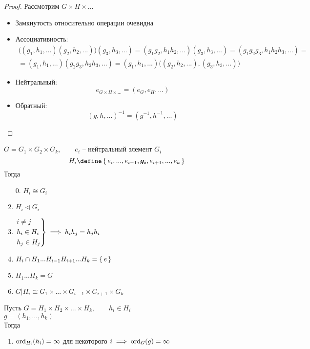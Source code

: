 \begin{proof}
    Рассмотрим $ G \times H \times ... $
    \begin{itemize}
    	\item Замкнутость относительно операции очевидна
        \item Ассоциативность:
        \begin{multline*}
            \bigg( (g_1, h_1, ...)(g_2, h_2, ...) \bigg) (g_3, h_3, ...) = (g_1g_2, h_1h_2, ...)(g_3, h_3, ...) = (g_1g_2g_3, h_1h_2h_3, ...) = \\ = (g_1, h_1, ...)(g_2g_3, h_2h_3, ...) = (g_1, h_1, ...) \bigg( (g_2, h_2, ...), (g_3, h_3, ...) \bigg)
        \end{multline*}
        \item Нейтральный:
        $$ e_{G \times H \times ...} = (e_G, e_H, ...) $$
        \item Обратный:
        $$ (g, h, ...)^{-1} = (g^{-1}, h^{-1}, ...) $$
    \end{itemize}
\end{proof}

\begin{property}
    $ G = G_1 \times G_2 \times G_k, \qquad e_i $ -- нейтральный элемент $ G_i $
    $$ H_i \define \set{e_i, ..., e_{i - 1}, \bm{g_i}, e_{i + 1}, ..., e_k} $$
    Тогда
    \begin{enumerate}
        \item[0.] $ H_i \cong G_i $
    	\item $ H_i \vartriangleleft G_i $
        \item $
        \begin{rcases}
        	i \ne j \\
            h_i \in H_i \\
            h_j \in H_j
        \end{rcases} \implies h_ih_j = h_jh_i $
        \item $ H_i \cap H_1 ... H_{i - 1}H_{i + 1} ... H_k = \set{e} $
        \item $ H_1 ... H_k = G $
        \item $ G|H_i \cong G_1 \times ... \times G_{i - 1} \times G_{i + 1} \times G_k $
    \end{enumerate}
\end{property}

\begin{lemma}
	Пусть $ G = H_1 \times H_2 \times ... \times H_k, \qquad h_i \in H_i $ \\
    $ g = (h_1, ..., h_k) $ \\
    Тогда
    \begin{enumerate}
        \item $ \operatorname{ord}_{H_i}(h_i) = \infty $ для некоторого $ i \implies \operatorname{ord}_G(g) = \infty $
    \end{enumerate}

\end{lemma}
